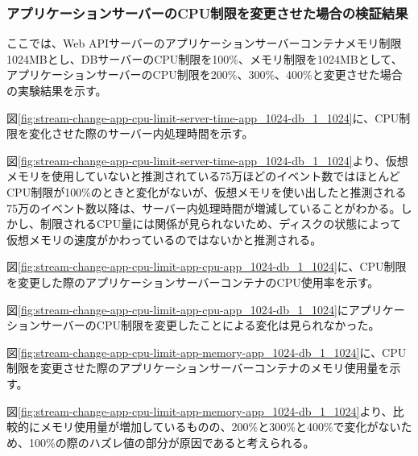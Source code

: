 \documentclass[../../../../main]{subfiles}
\begin{document}
    \subsubsection{アプリケーションサーバーのCPU制限を変更させた場合の検証結果}\label{subsubsec:result-chunk-change-app-cpu}

    ここでは、Web APIサーバーのアプリケーションサーバーコンテナメモリ制限1024MBとし、DBサーバーのCPU制限を100\%、メモリ制限を1024MBとして、アプリケーションサーバーのCPU制限を200\%、300\%、400\%と変更させた場合の実験結果を示す。


    図\ref{fig:stream-change-app-cpu-limit-server-time-app_1024-db_1_1024}に、CPU制限を変化させた際のサーバー内処理時間を示す。

    

    図\ref{fig:stream-change-app-cpu-limit-server-time-app_1024-db_1_1024}より、仮想メモリを使用していないと推測されている75万ほどのイベント数ではほとんどCPU制限が100\%のときと変化がないが、仮想メモリを使い出したと推測される75万のイベント数以降は、サーバー内処理時間が増減していることがわかる。しかし、制限されるCPU量には関係が見られないため、ディスクの状態によって仮想メモリの速度がかわっているのではないかと推測される。


    図\ref{fig:stream-change-app-cpu-limit-app-cpu-app_1024-db_1_1024}に、CPU制限を変更した際のアプリケーションサーバーコンテナのCPU使用率を示す。

    

    図\ref{fig:stream-change-app-cpu-limit-app-cpu-app_1024-db_1_1024}にアプリケーションサーバーのCPU制限を変更したことによる変化は見られなかった。


    図\ref{fig:stream-change-app-cpu-limit-app-memory-app_1024-db_1_1024}に、CPU制限を変更させた際のアプリケーションサーバーコンテナのメモリ使用量を示す。

    


    図\ref{fig:stream-change-app-cpu-limit-app-memory-app_1024-db_1_1024}より、比較的にメモリ使用量が増加しているものの、200\%と300\%と400\%で変化がないため、100\%の際のハズレ値の部分が原因であると考えられる。

\end{document}
